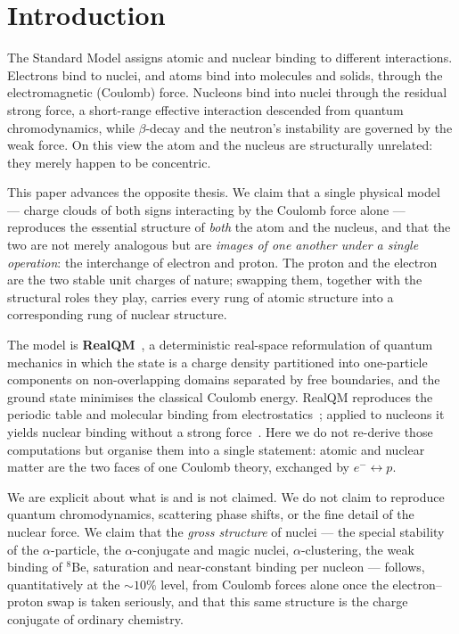 \documentclass[11pt]{article}
\begin{document}
\begin{abstract}
\medskip
\noindent\textbf{Keywords:} unified Coulomb model; RealQM; atomic structure; nuclear structure;
charge conjugation; electron--proton swap; $\alpha$ clustering; magic numbers; nuclear saturation;
size versus mass; mass and gravitation; free-boundary problems.
\end{abstract}


\section{Introduction}

The Standard Model assigns atomic and nuclear binding to different interactions. Electrons bind to
nuclei, and atoms bind into molecules and solids, through the electromagnetic (Coulomb) force.
Nucleons bind into nuclei through the residual strong force, a short-range effective interaction
descended from quantum chromodynamics, while $\beta$-decay and the neutron's instability are governed
by the weak force. On this view the atom and the nucleus are structurally unrelated: they merely
happen to be concentric.

This paper advances the opposite thesis. We claim that a single physical model --- charge clouds of
both signs interacting by the Coulomb force alone --- reproduces the essential structure of
\emph{both} the atom and the nucleus, and that the two are not merely analogous but are
\emph{images of one another under a single operation}: the interchange of electron and proton. The
proton and the electron are the two stable unit charges of nature; swapping them, together with the
structural roles they play, carries every rung of atomic structure into a corresponding rung of
nuclear structure.

The model is \textbf{RealQM}~\cite{Johnson-RealQM,Johnson-Book}, a deterministic real-space
reformulation of quantum mechanics in which the state is a charge density partitioned into
one-particle components on non-overlapping domains separated by free boundaries, and the ground state
minimises the classical Coulomb energy. RealQM reproduces the periodic table and molecular binding
from electrostatics~\cite{Johnson-Atoms}; applied to nucleons it yields nuclear binding without a
strong force~\cite{Johnson-RealNucleus}. Here we do not re-derive those computations but organise them
into a single statement: atomic and nuclear matter are the two faces of one Coulomb theory, exchanged
by $e^-\!\leftrightarrow p$.

We are explicit about what is and is not claimed. We do not claim to reproduce quantum chromodynamics,
scattering phase shifts, or the fine detail of the nuclear force. We claim that the \emph{gross
structure} of nuclei --- the special stability of the $\alpha$-particle, the $\alpha$-conjugate and
magic nuclei, $\alpha$-clustering, the weak binding of $^8$Be, saturation and near-constant binding
per nucleon --- follows, quantitatively at the $\sim\!10\%$ level, from Coulomb forces alone once the
electron--proton swap is taken seriously, and that this same structure is the charge conjugate of
ordinary chemistry.
\end{document}
